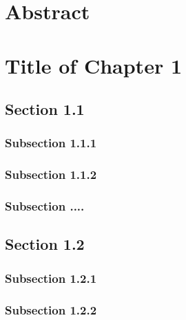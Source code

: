 \documentclass[13pt,a4paper]{extreport}
\begin{document}
\clearpage
{}
\listoffigures

\clearpage
{}
\listoftables




\justifying
\chapter*{Abstract}
\vspace{0.2cm}
\clearpage









\justifying
{}
\chapter{Title of Chapter 1}

\justifying
\section{Section 1.1}

\justifying
\subsection{Subsection 1.1.1}

\justifying
\subsection{Subsection 1.1.2}

\justifying
\subsection{Subsection ....}

\justifying
\section{Section 1.2}

\justifying
\subsection{Subsection 1.2.1}

\justifying
\subsection{Subsection 1.2.2}
\end{document}
